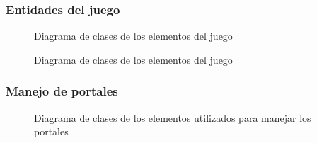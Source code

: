 \documentclass[a4paper]{article}
\begin{document}
\subsubsection{Entidades del juego}

\begin{figure}[!h]
	\caption{Diagrama de clases de los elementos del juego}
	\label{fig:diagrama1}
\end{figure}

\begin{figure}[!h]
	\caption{Diagrama de clases de los elementos del juego}
	\label{fig:diagrama2}
\end{figure}

\newpage
\subsubsection{Manejo de portales}

\begin{figure}[!h]
	\caption{Diagrama de clases de los elementos utilizados para manejar los portales}
	\label{fig:diagrama3}
\end{figure}
\end{document}
